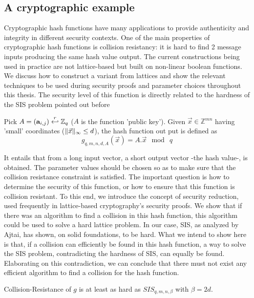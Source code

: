 \subsection{A cryptographic example}
\label{sec:ajtaiHash}
Cryptographic hash functions have many applications to
provide authenticity and integrity in different security contexts. One of the main properties of cryptographic
hash functions is collision resistancy: it is hard to find 2 message inputs
producing the same hash value output. The current constructions being used in practice
are not lattice-based but built on non-linear boolean functions. We discuss how
to construct a variant from lattices and show the relevant techniques
to be used during security proofs and parameter choices throughout this
thesis. The security level of this function is directly related to the hardness of
the SIS problem pointed out before
\begin{definition}
  Pick $A=(\mathbf{a}_{i,j}) \stackrel{r}{\hookleftarrow} \mathbb{Z}_q$ ($A$ is the function
  'public key'). Given $\vec{x} \in \mathbb{Z}^{mn}$ having 'small' coordinates
  ($\Vert \vec{x} \Vert_{\infty} \leq d$), the hash function out put is defined as
  \[
    g_{q,m,n,d,A}(\vec{x}) = A . \vec{x} \mod \ q
  \]
  \label{def:Ajtai's Hash Function}
\end{definition}
It entails that from a long input vector, a short output vector -the hash value-, is obtained. The parameter values should be chosen so as to make sure that the collision resistance constraint is
satisfied. The important question is how to determine the security of this
function, or how to ensure that this function is collision resistant. To this end, we
introduce the concept of security reduction, used frequently in
lattice-based cryptography's security proofs. We show that if there
was an algorithm to find a collision in this hash function, this algorithm could be used
to solve a hard lattice problem. In our case, SIS, as
analyzed by Ajtai, has shown, on solid foundations, to be hard. What we
intend to show here is that, if a collision can efficiently be found in this hash
function, a way to solve the SIS problem, contradicting the hardness of SIS, can equally be found. Elaborating on this contradiction, we can conclude that there must not exist any efficient algorithm to find a collision for the hash function.
\begin{theorem}
  Collision-Resistance of $g$ is at least as hard as $SIS_{q,m,n,\beta}$ with
  $\beta = 2d$.
  \label{the:ajtai hash}
\end{theorem}
